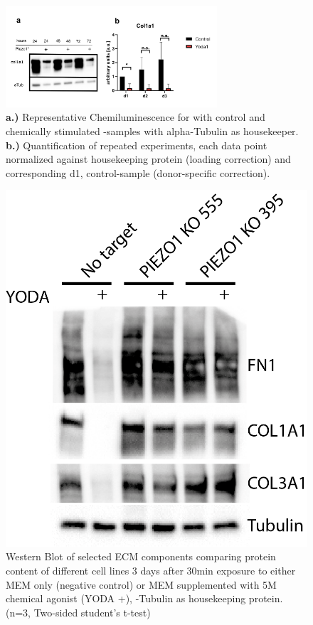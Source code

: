 \begin{figure}[htbp]
	\centering
	\includegraphics[width = 0.7\textwidth]{NormalYodaExp_WesternBlot_Col1a1.png}
	\caption{
		\textbf{a.)} Representative Chemiluminescence for \colone with control and chemically stimulated \Piezo{}-samples with alpha-Tubulin as housekeeper.
		\textbf{b.)} Quantification of repeated experiments, each data point normalized against housekeeping protein (loading correction) and corresponding d1, control-sample (donor-specific correction).}
	\label{fig:Yoda_Norm_WB}
\end{figure}

\begin{figure}
	\centering
	\includegraphics[width=0.7\linewidth]{Uli_Blot_KO.png}
	\caption{Western Blot of selected ECM components comparing protein content of different cell lines 3 days after 30min exposure to either MEM\textalpha{} only (negative control) or MEM\textalpha{} supplemented with 5\textmu{}M chemical \Piezo{} agonist (YODA +), \textalpha{}-Tubulin as housekeeping protein. (n=3, Two-sided student's t-test)
	}
	\label{pic:UliBlot}
\end{figure}

